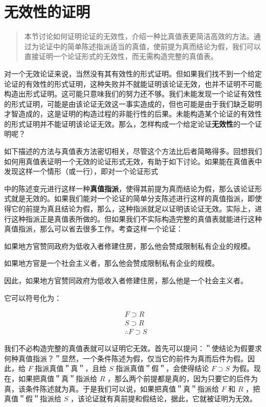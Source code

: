 \section{无效性的证明}

\begin{quotation}
本节讨论如何证明论证的无效性，介绍一种比真值表更简洁高效的方法。通过为论证中的简单陈述指派适当的真值，使前提为真而结论为假，我们可以直接证明一个论证形式的无效性，而无需构造完整的真值表。
\end{quotation}

对一个无效论证来说，当然没有其有效性的形式证明。但如果我们找不到一个给定论证的有效性的形式证明，这种失败并不就能证明该论证无效，也并不证明不可能构造出形式证明。这可能只意味我们的努力还不够。我们未能发现一个论证有效性的形式证明，可能是由该论证无效这一事实造成的，但也可能是由于我们缺乏聪明才智造成的，这是证明的构造过程的非能行性的后果。未能构造某个论证的有效性的形式证明并不能证明该论证无效。那么，怎样构成一个给定论证\textbf{无效性}的一个证明呢？

如下描述的方法与真值表方法密切相关，尽管这个方法比后者简略得多。回想我们如何用真值表证明一个无效的论证形式无效，有助于如下讨论。如果能在真值表中发现这样一个情形（或一行），即对一个论证形式

中的陈述变元进行这样一种\textbf{真值指派}，使得其前提为真而结论为假，那么该论证形式就是无效的。如果我们能对一个论证的简单分支陈述进行这样的真值指派，即使得它的前提为真且结论为假，那么，这种指派就足以证明该论证无效。实际上，进行这种指派正是真值表所做的。但如果我们不实际构造完整的真值表就能进行这种真值指派，那么可以省去很多工作。考查这样一个论证：

如果地方官赞同政府为低收入者修建住房，那么他会赞成限制私有企业的规模。

如果地方官是一个社会主义者，那么他会赞成限制私有企业的规模。

因此，如果地方官赞同政府为低收入者修建住房，那么他是一个社会主义者。

它可以符号化为：

$$
\begin{aligned}
& F \supset R \\
& S \supset R \\
& \therefore F \supset S
\end{aligned}
$$

我们不必构造完整的真值表就可以证明它无效。首先可以提问：＂使结论为假要求何种真值指派？＂显然，一个条件陈述为假，仅当它的前件为真而后件为假。因此，给 $F$ 指派真值＂真＂，且给 $S$ 指派真值＂假＂，会使得结论 $F \supset S$ 为假。现在，如果把真值＂真＂指派给 $R$ ，那么两个前提都是真的，因为只要它的后件为真，该条件陈述就为真。于是我们可以说，如果把真值＂真＂指派给 $F$ 和 $R$ ，把真值＂假＂指派给 $S$ ，该论证就有真前提和假结论，据此，它就被证明为无效。

